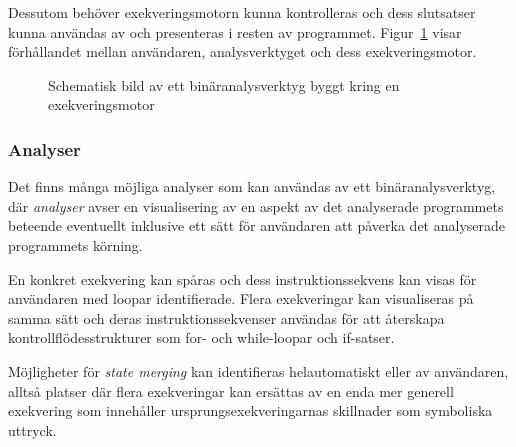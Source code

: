 Dessutom behöver exekveringsmotorn kunna kontrolleras och dess
slutsatser kunna användas av och presenteras i resten av programmet.
Figur~\ref{schematic} visar förhållandet mellan användaren, analysverktyget och
dess exekveringsmotor.

\begin{figure}[H] \centering {} \caption{ Schematisk bild av ett binäranalysverktyg byggt
	kring en exekveringsmotor }\label{schematic} \end{figure}

\subsubsection{Analyser}

Det finns många möjliga analyser som kan användas av ett binäranalysverktyg, där
\textit{analyser} avser en visualisering av en aspekt av det analyserade
programmets beteende eventuellt inklusive ett sätt för användaren att påverka
det analyserade programmets körning.

En konkret exekvering kan spåras och dess instruktionssekvens kan visas för
användaren med loopar identifierade. Flera exekveringar kan visualiseras på
samma sätt och deras instruktionssekvenser användas för att återskapa
kontrollflödesstrukturer som for- och while-loopar och if-satser.

Möjligheter för \textit{state merging} kan identifieras helautomatiskt eller av
användaren, alltså platser där flera exekveringar kan ersättas av en enda mer
generell exekvering som innehåller ursprungsexekveringarnas skillnader som
symboliska uttryck.

